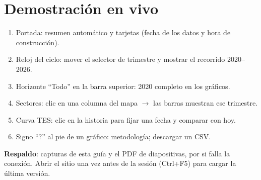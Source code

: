 \documentclass[11pt]{article}
\begin{document}
\section{Demostración en vivo}
\label{sec:demo}
\begin{enumerate}
\item Portada: resumen automático y tarjetas (fecha de los datos y hora de construcción).
\item Reloj del ciclo: mover el selector de trimestre y mostrar el recorrido 2020–2026.
\item Horizonte “Todo” en la barra superior: 2020 completo en los gráficos.
\item Sectores: clic en una columna del mapa $\rightarrow$ las barras muestran ese trimestre.
\item Curva TES: clic en la historia para fijar una fecha y comparar con hoy.
\item Signo “?” al pie de un gráfico: metodología; descargar un CSV.
\end{enumerate}
\textbf{Respaldo}: capturas de esta guía y el PDF de diapositivas, por si falla la conexión. Abrir el sitio una vez antes
de la sesión (Ctrl+F5) para cargar la última versión.
\end{document}
